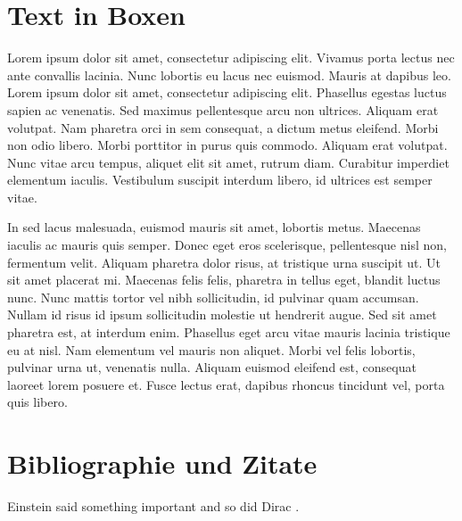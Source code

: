 \documentclass[12pt, a4paper, twopage]{scrartcl}
\begin{document}










\section{Text in Boxen}

\begin{mdframed}[style=exampledefault,frametitle={Braucht package mdframed.}]
Lorem ipsum dolor sit amet, consectetur adipiscing elit. Vivamus porta lectus nec ante convallis lacinia. Nunc lobortis eu lacus nec euismod. Mauris at dapibus leo. Lorem ipsum dolor sit amet, consectetur adipiscing elit. Phasellus egestas luctus sapien ac venenatis. Sed maximus pellentesque arcu non ultrices. Aliquam erat volutpat. Nam pharetra orci in sem consequat, a dictum metus eleifend. Morbi non odio libero. Morbi porttitor in purus quis commodo. Aliquam erat volutpat. Nunc vitae arcu tempus, aliquet elit sit amet, rutrum diam. Curabitur imperdiet elementum iaculis. Vestibulum suscipit interdum libero, id ultrices est semper vitae.
\end{mdframed}


\begin{mdframed}[style=simple,frametitle={Mein style.}]

In sed lacus malesuada, euismod mauris sit amet, lobortis metus. Maecenas iaculis ac mauris quis semper. Donec eget eros scelerisque, pellentesque nisl non, fermentum velit. Aliquam pharetra dolor risus, at tristique urna suscipit ut. Ut sit amet placerat mi. Maecenas felis felis, pharetra in tellus eget, blandit luctus nunc. Nunc mattis tortor vel nibh sollicitudin, id pulvinar quam accumsan. Nullam id risus id ipsum sollicitudin molestie ut hendrerit augue. Sed sit amet pharetra est, at interdum enim. Phasellus eget arcu vitae mauris lacinia tristique eu at nisl. Nam elementum vel mauris non aliquet. Morbi vel felis lobortis, pulvinar urna ut, venenatis nulla. Aliquam euismod eleifend est, consequat laoreet lorem posuere et. Fusce lectus erat, dapibus rhoncus tincidunt vel, porta quis libero. 

\end{mdframed}




\section{Bibliographie und Zitate}
Einstein said something important\cite{einstein} and so did Dirac \cite{dirac}.
\end{document}
